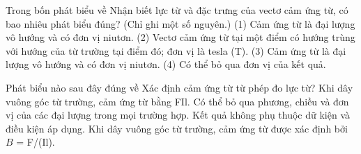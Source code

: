 \begin{ex}
Trong bốn phát biểu về Nhận biết lực từ và đặc trưng của vectơ cảm ứng từ, có bao nhiêu phát biểu đúng? (Chỉ ghi một số nguyên.) (1) Cảm ứng từ là đại lượng vô hướng và có đơn vị niutơn. (2) Vectơ cảm ứng từ tại một điểm có hướng trùng với hướng của từ trường tại điểm đó; đơn vị là tesla (T). (3) Cảm ứng từ là đại lượng vô hướng và có đơn vị niutơn. (4) Có thể bỏ qua đơn vị của kết quả.
\end{ex}

\begin{ex}
Phát biểu nào sau đây đúng về Xác định cảm ứng từ từ phép đo lực từ?
\choice
{Khi dây vuông góc từ trường, cảm ứng từ bằng FIl.}
{Có thể bỏ qua phương, chiều và đơn vị của các đại lượng trong mọi trường hợp.}
{Kết quả không phụ thuộc dữ kiện và điều kiện áp dụng.}
{\True Khi dây vuông góc từ trường, cảm ứng từ được xác định bởi $B$ = F/(Il).}
\end{ex}

